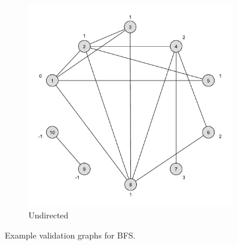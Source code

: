 \begin{figure}[h]
\begin{subfigure}{0.496\textwidth}
		\includegraphics[scale=\examplescale]{figures/examples/bfs-undir.pdf}
		\caption{Undirected}
	\end{subfigure}
	\caption{Example validation graphs for BFS.}
	\label{fig:bfs_example}
\end{figure}


